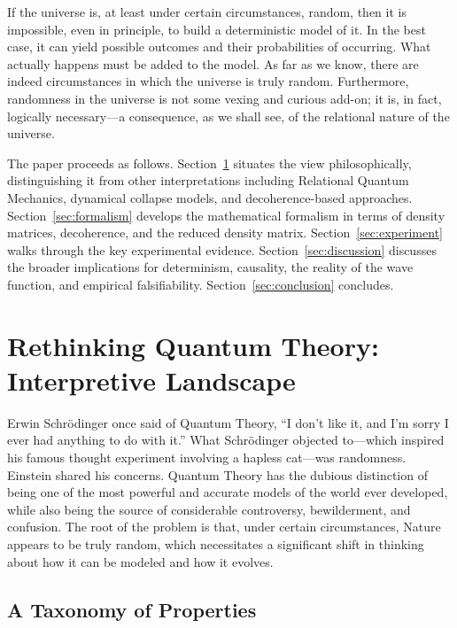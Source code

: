 \documentclass[11pt,a4paper]{article}
\theoremstyle{plain}
\theoremstyle{definition}
\theoremstyle{remark}
\begin{document}
If the universe is, at least under certain circumstances, random, then it is
impossible, even in principle, to build a deterministic model of it. In the best
case, it can yield possible outcomes and their probabilities of occurring. What
actually happens must be added to the model. As far as we know, there are indeed
circumstances in which the universe is truly random. Furthermore, randomness in
the universe is not some vexing and curious add-on; it is, in fact, logically
necessary---a consequence, as we shall see, of the relational nature of the
universe.

The paper proceeds as follows. Section~\ref{sec:landscape} situates the view
philosophically, distinguishing it from other interpretations including Relational
Quantum Mechanics, dynamical collapse models, and decoherence-based approaches.
Section~\ref{sec:formalism} develops the mathematical formalism in terms of
density matrices, decoherence, and the reduced density matrix.
Section~\ref{sec:experiment} walks through the key experimental evidence.
Section~\ref{sec:discussion} discusses the broader implications for determinism,
causality, the reality of the wave function, and empirical falsifiability.
Section~\ref{sec:conclusion} concludes.

\section{Rethinking Quantum Theory: Interpretive Landscape}
\label{sec:landscape}

Erwin Schr\"{o}dinger once said of Quantum Theory, ``I don't like it, and I'm
sorry I ever had anything to do with it.'' What Schr\"{o}dinger objected
to---which inspired his famous thought experiment involving a hapless cat---was
randomness. Einstein shared his concerns. Quantum Theory has the dubious
distinction of being one of the most powerful and accurate models of the world
ever developed, while also being the source of considerable controversy,
bewilderment, and confusion. The root of the problem is that, under certain
circumstances, Nature appears to be truly random, which necessitates a significant
shift in thinking about how it can be modeled and how it evolves.

\subsection{A Taxonomy of Properties}
\end{document}

